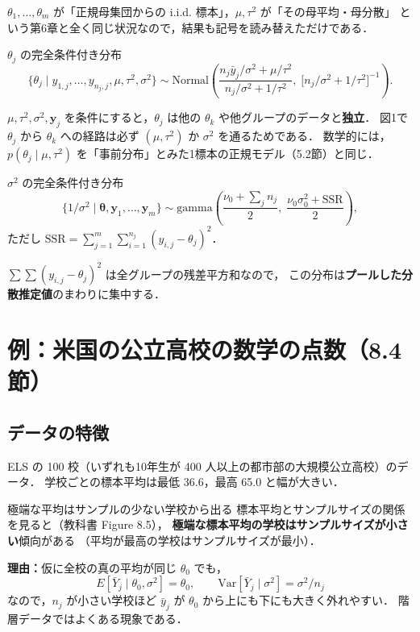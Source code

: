 \documentclass[lualatex,ja=standard,a4paper,12pt]{bxjsarticle}
\begin{document}
\noindent $\theta_1, \ldots, \theta_m$ が「正規母集団からの i.i.d. 標本」，$\mu, \tau^2$ が「その母平均・母分散」
という第6章と全く同じ状況なので，結果も記号を読み替えただけである．

\begin{thmbox}{$\theta_j$ の完全条件付き分布}
\[
  \{\theta_j \mid y_{1,j}, \ldots, y_{n_j,j}, \mu, \tau^2, \sigma^2\} \sim
  \mathrm{Normal}\!\left(\frac{n_j\bar{y}_j/\sigma^2 + \mu/\tau^2}{n_j/\sigma^2 + 1/\tau^2},\;
  \bigl[n_j/\sigma^2 + 1/\tau^2\bigr]^{-1}\right).
\]
\end{thmbox}

\noindent $\mu, \tau^2, \sigma^2, \bm{y}_j$ を条件にすると，$\theta_j$ は他の $\theta_k$ や他グループのデータと\textbf{独立}．
図1で $\theta_j$ から $\theta_k$ への経路は必ず $(\mu, \tau^2)$ か $\sigma^2$ を通るためである．
数学的には，$p(\theta_j \mid \mu, \tau^2)$ を「事前分布」とみた1標本の正規モデル（5.2節）と同じ．

\begin{thmbox}{$\sigma^2$ の完全条件付き分布}
\[
  \{1/\sigma^2 \mid \bm{\theta}, \bm{y}_1, \ldots, \bm{y}_m\} \sim
  \mathrm{gamma}\!\left(\frac{\nu_0 + \sum_j n_j}{2},\;
  \frac{\nu_0\sigma_0^2 + \mathrm{SSR}}{2}\right),
\]
ただし $\mathrm{SSR} = \sum_{j=1}^m\sum_{i=1}^{n_j}(y_{i,j} - \theta_j)^2$．
\end{thmbox}

\noindent $\sum\sum(y_{i,j} - \theta_j)^2$ は全グループの残差平方和なので，
この分布は\textbf{プールした分散推定値}のまわりに集中する．

\section{例：米国の公立高校の数学の点数（8.4節）}

\subsection{データの特徴}

ELS の 100 校（いずれも10年生が 400 人以上の都市部の大規模公立高校）のデータ．
学校ごとの標本平均は最低 36.6，最高 65.0 と幅が大きい．

\begin{exbox}{極端な平均はサンプルの少ない学校から出る}
標本平均とサンプルサイズの関係を見ると（教科書 Figure 8.5），
\textbf{極端な標本平均の学校はサンプルサイズが小さい}傾向がある
（平均が最高の学校はサンプルサイズが最小）．

\medskip
\noindent\textbf{理由：}仮に全校の真の平均が同じ $\theta_0$ でも，
\[
  E[\bar{Y}_j \mid \theta_0, \sigma^2] = \theta_0, \qquad
  \mathrm{Var}[\bar{Y}_j \mid \sigma^2] = \sigma^2/n_j
\]
なので，$n_j$ が小さい学校ほど $\bar{y}_j$ が $\theta_0$ から上にも下にも大きく外れやすい．
階層データではよくある現象である．
\end{exbox}
\end{document}
